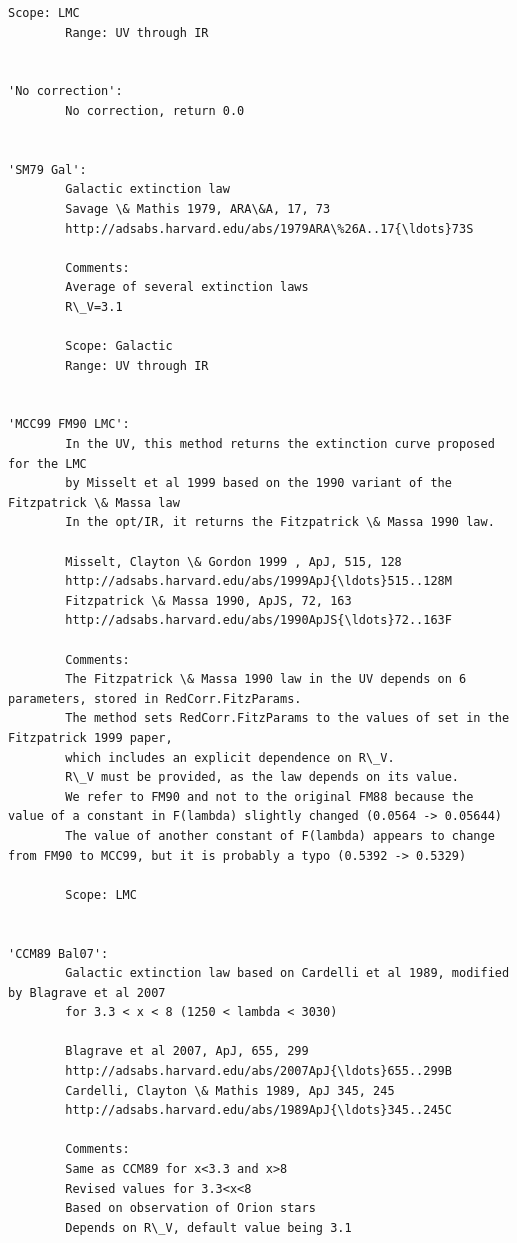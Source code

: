 \documentclass{report}
\begin{document}
\begin{Verbatim}[commandchars=\\\{\}]
        Scope: LMC
        Range: UV through IR

        
'No correction': 
        No correction, return 0.0
        
        
'SM79 Gal': 
        Galactic extinction law
        Savage \& Mathis 1979, ARA\&A, 17, 73
        http://adsabs.harvard.edu/abs/1979ARA\%26A..17{\ldots}73S
        
        Comments:
        Average of several extinction laws
        R\_V=3.1
        
        Scope: Galactic
        Range: UV through IR
        
        
'MCC99 FM90 LMC': 
        In the UV, this method returns the extinction curve proposed for the LMC 
        by Misselt et al 1999 based on the 1990 variant of the Fitzpatrick \& Massa law
        In the opt/IR, it returns the Fitzpatrick \& Massa 1990 law.

        Misselt, Clayton \& Gordon 1999 , ApJ, 515, 128 
        http://adsabs.harvard.edu/abs/1999ApJ{\ldots}515..128M
        Fitzpatrick \& Massa 1990, ApJS, 72, 163
        http://adsabs.harvard.edu/abs/1990ApJS{\ldots}72..163F
        
        Comments:
        The Fitzpatrick \& Massa 1990 law in the UV depends on 6 parameters, stored in RedCorr.FitzParams.
        The method sets RedCorr.FitzParams to the values of set in the Fitzpatrick 1999 paper, 
        which includes an explicit dependence on R\_V.
        R\_V must be provided, as the law depends on its value.
        We refer to FM90 and not to the original FM88 because the value of a constant in F(lambda) slightly changed (0.0564 -> 0.05644)
        The value of another constant of F(lambda) appears to change from FM90 to MCC99, but it is probably a typo (0.5392 -> 0.5329) 
        
        Scope: LMC

        
'CCM89 Bal07': 
        Galactic extinction law based on Cardelli et al 1989, modified by Blagrave et al 2007 
        for 3.3 < x < 8 (1250 < lambda < 3030)
        
        Blagrave et al 2007, ApJ, 655, 299 
        http://adsabs.harvard.edu/abs/2007ApJ{\ldots}655..299B
        Cardelli, Clayton \& Mathis 1989, ApJ 345, 245
        http://adsabs.harvard.edu/abs/1989ApJ{\ldots}345..245C

        Comments:
        Same as CCM89 for x<3.3 and x>8
        Revised values for 3.3<x<8
        Based on observation of Orion stars
        Depends on R\_V, default value being 3.1


\end{Verbatim}
\end{document}
